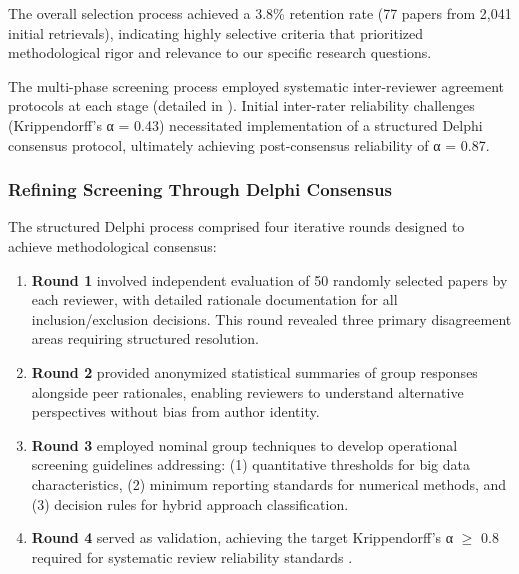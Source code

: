 \documentclass[acmsmall]{acmart}
\begin{document}
The overall selection process achieved a 3.8\% retention rate (77 papers from 2,041 initial retrievals), indicating highly selective criteria that prioritized methodological rigor and relevance to our specific research questions.


The multi-phase screening process employed systematic inter-reviewer agreement protocols at each stage (detailed in ). Initial inter-rater reliability challenges (Krippendorff's α = 0.43) necessitated implementation of a structured Delphi consensus protocol, ultimately achieving post-consensus reliability of α = 0.87.

\subsubsection{Refining Screening Through Delphi Consensus}\label{subsubsec:phase-2-literature-search-and-study-selection:refining-screening-through-delphi-consensus}

The structured Delphi process comprised four iterative rounds designed to achieve methodological consensus:

\begin{enumerate}
    \item \textbf{Round 1} involved independent evaluation of 50 randomly selected papers by each reviewer, with detailed rationale documentation for all inclusion/exclusion decisions. This round revealed three primary disagreement areas requiring structured resolution.

    \item \textbf{Round 2} provided anonymized statistical summaries of group responses alongside peer rationales, enabling reviewers to understand alternative perspectives without bias from author identity.

    \item \textbf{Round 3} employed nominal group techniques \citep{delbecq1971group} to develop operational screening guidelines addressing: (1) quantitative thresholds for big data characteristics, (2) minimum reporting standards for numerical methods, and (3) decision rules for hybrid approach classification.

    \item \textbf{Round 4} served as validation, achieving the target Krippendorff's α $\geq$ 0.8 required for systematic review reliability standards \citep{krippendorff2004reliability}.
\end{enumerate}
\end{document}
